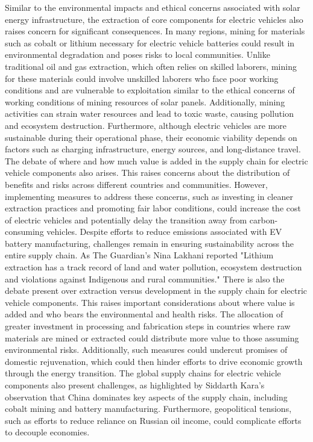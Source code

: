 \documentclass[10pt,twocolumn]{article}
\begin{document}
Similar to the environmental impacts and ethical concerns associated with solar energy infrastructure, the extraction of core components for electric vehicles also raises concern for significant consequences. In many regions, mining for materials such as cobalt or lithium necessary for electric vehicle batteries could result in environmental degradation and poses risks to local communities. Unlike traditional oil and gas extraction, which often relies on skilled laborers, mining for these materials could involve unskilled laborers who face poor working conditions and are vulnerable to exploitation similar to the ethical concerns of working conditions of mining resources of solar panels. Additionally, mining activities can strain water resources and lead to toxic waste, causing pollution and ecosystem destruction. Furthermore, although electric vehicles are more sustainable during their operational phase, their economic viability depends on factors such as charging infrastructure, energy sources, and long-distance travel. The debate of where and how much value is added in the supply chain for electric vehicle components also arises. This raises concerns about the distribution of benefits and risks across different countries and communities. However, implementing measures to address these concerns, such as investing in cleaner extraction practices and promoting fair labor conditions, could increase the cost of electric vehicles and potentially delay the transition away from carbon-consuming vehicles. Despite efforts to reduce emissions associated with EV battery manufacturing, challenges remain in ensuring sustainability across the entire supply chain. As The Guardian's Nina Lakhani reported "Lithium extraction has a track record of land and water pollution, ecosystem destruction and violations against Indigenous and rural communities." There is also the  debate present over extraction versus development in the supply chain for electric vehicle components. This raises important considerations about where value is added and who bears the environmental and health risks. The allocation of greater investment in processing and fabrication steps in countries where raw materials are mined or extracted could distribute more value to those assuming environmental risks. Additionally, such measures could undercut promises of domestic rejuvenation, which could then hinder efforts to drive economic growth through the energy transition. The global supply chains for electric vehicle components also present challenges, as highlighted by Siddarth Kara's observation that China dominates key aspects of the supply chain, including cobalt mining and battery manufacturing. Furthermore, geopolitical tensions, such as efforts to reduce reliance on Russian oil income, could complicate efforts to decouple economies. 
\end{document}
